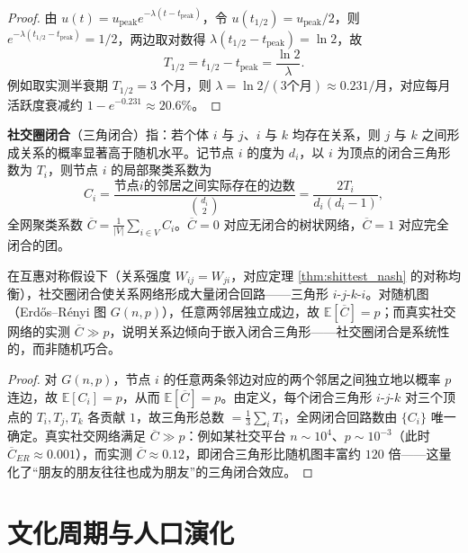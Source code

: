 \begin{proof}
由 $u(t) = u_{\text{peak}} e^{-\lambda(t-t_{\text{peak}})}$，令 $u(t_{1/2}) = u_{\text{peak}}/2$，则 $e^{-\lambda(t_{1/2}-t_{\text{peak}})} = 1/2$，两边取对数得 $\lambda(t_{1/2}-t_{\text{peak}}) = \ln 2$，故
\[
T_{1/2} = t_{1/2} - t_{\text{peak}} = \frac{\ln 2}{\lambda}.
\]
例如取实测半衰期 $T_{1/2} = 3$ 个月，则 $\lambda = \ln 2/(3\text{个月}) \approx 0.231/\text{月}$，对应每月活跃度衰减约 $1 - e^{-0.231} \approx 20.6\%$。
\end{proof}

\begin{definition}[社交圈闭合]\label{ch27_triadic_closure}
\textbf{社交圈闭合}（三角闭合）指：若个体 $i$ 与 $j$、$i$ 与 $k$ 均存在关系，则 $j$ 与 $k$ 之间形成关系的概率显著高于随机水平。记节点 $i$ 的度为 $d_i$，以 $i$ 为顶点的闭合三角形数为 $T_i$，则节点 $i$ 的局部聚类系数为
\[
C_i = \frac{\text{节点}i\text{的邻居之间实际存在的边数}}{\binom{d_i}{2}} = \frac{2T_i}{d_i(d_i-1)},
\]
全网聚类系数 $\overline{C} = \frac{1}{|V|}\sum_{i\in V} C_i$。$\overline{C}=0$ 对应无闭合的树状网络，$\overline{C}=1$ 对应完全闭合的团。
\end{definition}

\begin{proposition}[社交圈闭合的关系回路]\label{ch27_closure_loop}
在互惠对称假设下（关系强度 $W_{ij}=W_{ji}$，对应定理 \ref{thm:shittest_nash} 的对称均衡），社交圈闭合使关系网络形成大量闭合回路——三角形 $i$-$j$-$k$-$i$。对随机图（Erdős–Rényi 图 $G(n,p)$），任意两邻居独立成边，故 $\mathbb{E}[\overline{C}] = p$；而真实社交网络的实测 $\overline{C} \gg p$，说明关系边倾向于嵌入闭合三角形——社交圈闭合是系统性的，而非随机巧合。
\end{proposition}

\begin{proof}
对 $G(n,p)$，节点 $i$ 的任意两条邻边对应的两个邻居之间独立地以概率 $p$ 连边，故 $\mathbb{E}[C_i] = p$，从而 $\mathbb{E}[\overline{C}] = p$。由定义，每个闭合三角形 $i$-$j$-$k$ 对三个顶点的 $T_i, T_j, T_k$ 各贡献 $1$，故三角形总数 $= \frac{1}{3}\sum_i T_i$，全网闭合回路数由 $\{C_i\}$ 唯一确定。真实社交网络满足 $\overline{C} \gg p$：例如某社交平台 $n \sim 10^4$、$p \sim 10^{-3}$（此时 $\overline{C}_{ER}\approx 0.001$），而实测 $\overline{C}\approx 0.12$，即闭合三角形比随机图丰富约 $120$ 倍——这量化了“朋友的朋友往往也成为朋友”的三角闭合效应。
\end{proof}

\section{文化周期与人口演化}

